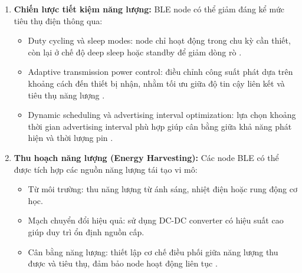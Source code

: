 \begin{enumerate}[label=\arabic*)]
	\item \textbf{Chiến lược tiết kiệm năng lượng:} BLE node có thể giảm đáng kể mức tiêu thụ điện thông qua:
		\begin{itemize}[label=-]
			\item Duty cycling và sleep modes: node chỉ hoạt động trong chu kỳ cần thiết, còn lại ở chế độ deep sleep hoặc standby để giảm dòng rò \cite{Kindt2019Precise}.
			\item Adaptive transmission power control: điều chỉnh công suất phát dựa trên khoảng cách đến thiết bị nhận, nhằm tối ưu giữa độ tin cậy liên kết và tiêu thụ năng lượng \cite{Siekkinen2013BLEvsZigBee}.
			\item Dynamic scheduling và advertising interval optimization: lựa chọn khoảng thời gian advertising interval phù hợp giúp cân bằng giữa khả năng phát hiện và thời lượng pin \cite{Abdeddaim2020BLEAdvertising}.
		\end{itemize}
	\item \textbf{Thu hoạch năng lượng (Energy Harvesting):} Các node BLE có thể được tích hợp các nguồn năng lượng tái tạo vi mô:
		\begin{itemize}[label=-]
			\item Từ môi trường: thu năng lượng từ ánh sáng, nhiệt điện hoặc rung động cơ học.
			\item Mạch chuyển đổi hiệu quả: sử dụng DC-DC converter có hiệu suất cao giúp duy trì ổn định nguồn cấp.
			\item Cân bằng năng lượng: thiết lập cơ chế điều phối giữa năng lượng thu được và tiêu thụ, đảm bảo node hoạt động liên tục \cite{Roundy2003Scavenging}.
		\end{itemize}

\end{enumerate}
